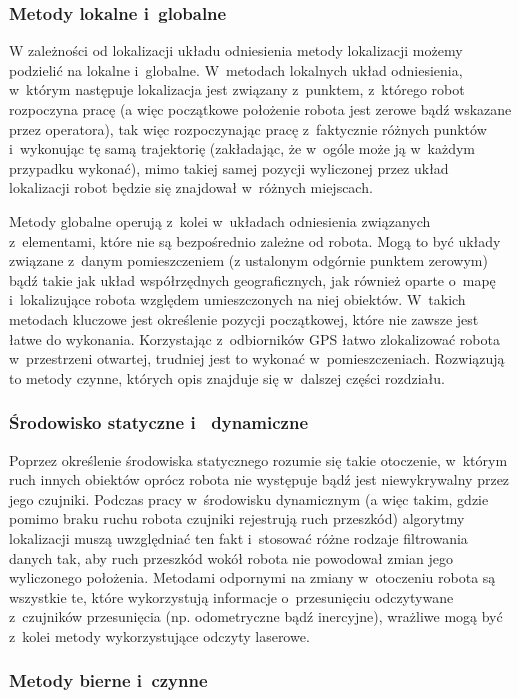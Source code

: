 \subsubsection{Metody lokalne i~globalne}

W zależności od lokalizacji układu odniesienia metody lokalizacji możemy
podzielić na lokalne i~globalne. W~metodach lokalnych układ odniesienia, 
w~którym następuje lokalizacja jest związany z~punktem, z~którego robot rozpoczyna
pracę (a więc początkowe położenie robota jest zerowe bądź wskazane przez
operatora), tak więc rozpoczynając pracę z~faktycznie różnych punktów 
i~wykonując tę samą trajektorię (zakładając, że w~ogóle może ją w~każdym
przypadku wykonać), mimo takiej samej pozycji wyliczonej przez układ
lokalizacji robot będzie się znajdował w~różnych miejscach.

Metody globalne operują z~kolei w~układach odniesienia związanych z~elementami,
które nie są bezpośrednio zależne od robota. Mogą to być układy związane z~danym
pomieszczeniem (z ustalonym odgórnie punktem zerowym) bądź takie jak układ
współrzędnych geograficznych, jak również oparte o~mapę i~lokalizujące robota
względem umieszczonych na niej obiektów. W~takich metodach kluczowe jest
określenie pozycji początkowej, które nie zawsze jest łatwe do wykonania.
Korzystając z~odbiorników GPS łatwo zlokalizować robota w~przestrzeni otwartej,
trudniej jest to wykonać w~pomieszczeniach. Rozwiązują to metody czynne, których
opis znajduje się w~dalszej części rozdziału.

\subsubsection{Środowisko statyczne i~ dynamiczne}

Poprzez określenie środowiska statycznego rozumie się takie otoczenie, w~którym
ruch innych obiektów oprócz robota nie występuje bądź jest niewykrywalny przez
jego czujniki. Podczas pracy w~środowisku dynamicznym (a więc takim, gdzie
pomimo braku ruchu robota czujniki rejestrują ruch przeszkód) algorytmy
lokalizacji muszą uwzględniać ten fakt i~stosować różne rodzaje filtrowania
danych tak, aby ruch przeszkód wokół robota nie powodował zmian jego wyliczonego
położenia. Metodami odpornymi na zmiany w~otoczeniu robota są wszystkie te,
które wykorzystują informacje o~przesunięciu odczytywane z~czujników
przesunięcia (np. odometryczne bądź inercyjne), wrażliwe mogą być z~kolei metody
wykorzystujące odczyty laserowe.

\subsubsection{Metody bierne i~czynne}

